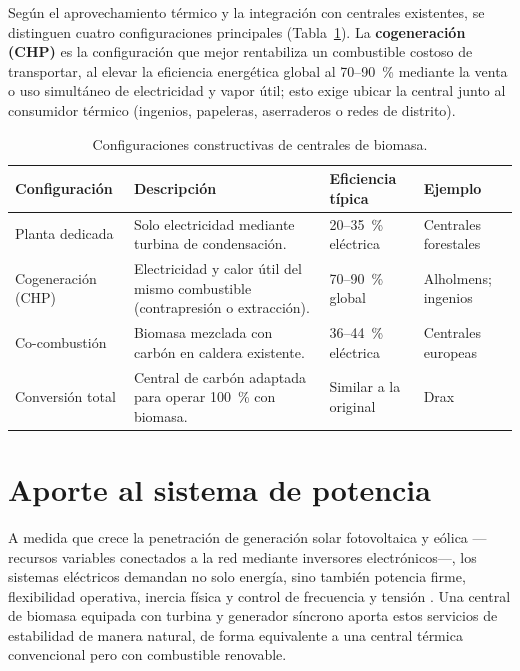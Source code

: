 Según el aprovechamiento térmico y la integración con centrales existentes, se distinguen cuatro configuraciones principales (Tabla~\ref{tab:configuraciones_planta}). La \textbf{cogeneración (CHP)} es la configuración que mejor rentabiliza un combustible costoso de transportar, al elevar la eficiencia energética global al 70--90~\% mediante la venta o uso simultáneo de electricidad y vapor útil; esto exige ubicar la central junto al consumidor térmico (ingenios, papeleras, aserraderos o redes de distrito).

\begin{table}[htbp]
\centering
\caption{Configuraciones constructivas de centrales de biomasa.}
\label{tab:configuraciones_planta}
\begin{tabularx}{\textwidth}{@{}l X l l@{}}
\toprule
\textbf{Configuración} & \textbf{Descripción} & \textbf{Eficiencia típica} & \textbf{Ejemplo} \\
\midrule
Planta dedicada & Solo electricidad mediante turbina de condensación. & 20--35~\% eléctrica & Centrales forestales \\
Cogeneración (CHP) & Electricidad y calor útil del mismo combustible (contrapresión o extracción). & 70--90~\% global & Alholmens; ingenios \\
Co-combustión & Biomasa mezclada con carbón en caldera existente. & 36--44~\% eléctrica \cite{irena2013cofiring} & Centrales europeas \\
Conversión total & Central de carbón adaptada para operar 100~\% con biomasa. & Similar a la original & Drax \cite{drax2025annual} \\
\bottomrule
\end{tabularx}
\end{table}

\section{Aporte al sistema de potencia}
\label{sec:aporte_red}

A medida que crece la penetración de generación solar fotovoltaica y eólica ---recursos variables conectados a la red mediante inversores electrónicos---, los sistemas eléctricos demandan no solo energía, sino también potencia firme, flexibilidad operativa, inercia física y control de frecuencia y tensión \cite{bindu2025inertia, denholm2020inertia}. Una central de biomasa equipada con turbina y generador síncrono aporta estos servicios de estabilidad de manera natural, de forma equivalente a una central térmica convencional pero con combustible renovable.

